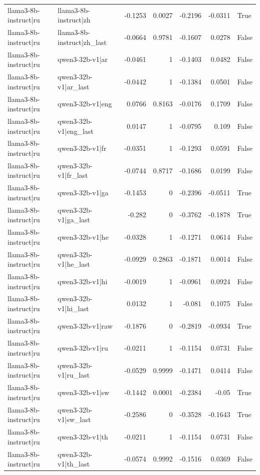 \begin{table}
\begin{tabular}{l l r r r r l}
llama3-8b-instruct|ru & llama3-8b-instruct|zh & -0.1253 & 0.0027 & -0.2196 & -0.0311 & True \\
llama3-8b-instruct|ru & llama3-8b-instruct|zh_last & -0.0664 & 0.9781 & -0.1607 & 0.0278 & False \\
llama3-8b-instruct|ru & qwen3-32b-v1|ar & -0.0461 & 1 & -0.1403 & 0.0482 & False \\
llama3-8b-instruct|ru & qwen3-32b-v1|ar_last & -0.0442 & 1 & -0.1384 & 0.0501 & False \\
llama3-8b-instruct|ru & qwen3-32b-v1|eng & 0.0766 & 0.8163 & -0.0176 & 0.1709 & False \\
llama3-8b-instruct|ru & qwen3-32b-v1|eng_last & 0.0147 & 1 & -0.0795 & 0.109 & False \\
llama3-8b-instruct|ru & qwen3-32b-v1|fr & -0.0351 & 1 & -0.1293 & 0.0591 & False \\
llama3-8b-instruct|ru & qwen3-32b-v1|fr_last & -0.0744 & 0.8717 & -0.1686 & 0.0199 & False \\
llama3-8b-instruct|ru & qwen3-32b-v1|ga & -0.1453 & 0 & -0.2396 & -0.0511 & True \\
llama3-8b-instruct|ru & qwen3-32b-v1|ga_last & -0.282 & 0 & -0.3762 & -0.1878 & True \\
llama3-8b-instruct|ru & qwen3-32b-v1|he & -0.0328 & 1 & -0.1271 & 0.0614 & False \\
llama3-8b-instruct|ru & qwen3-32b-v1|he_last & -0.0929 & 0.2863 & -0.1871 & 0.0014 & False \\
llama3-8b-instruct|ru & qwen3-32b-v1|hi & -0.0019 & 1 & -0.0961 & 0.0924 & False \\
llama3-8b-instruct|ru & qwen3-32b-v1|hi_last & 0.0132 & 1 & -0.081 & 0.1075 & False \\
llama3-8b-instruct|ru & qwen3-32b-v1|raw & -0.1876 & 0 & -0.2819 & -0.0934 & True \\
llama3-8b-instruct|ru & qwen3-32b-v1|ru & -0.0211 & 1 & -0.1154 & 0.0731 & False \\
llama3-8b-instruct|ru & qwen3-32b-v1|ru_last & -0.0529 & 0.9999 & -0.1471 & 0.0414 & False \\
llama3-8b-instruct|ru & qwen3-32b-v1|sw & -0.1442 & 0.0001 & -0.2384 & -0.05 & True \\
llama3-8b-instruct|ru & qwen3-32b-v1|sw_last & -0.2586 & 0 & -0.3528 & -0.1643 & True \\
llama3-8b-instruct|ru & qwen3-32b-v1|th & -0.0211 & 1 & -0.1154 & 0.0731 & False \\
llama3-8b-instruct|ru & qwen3-32b-v1|th_last & -0.0574 & 0.9992 & -0.1516 & 0.0369 & False \\

\end{tabular}
\end{table}
